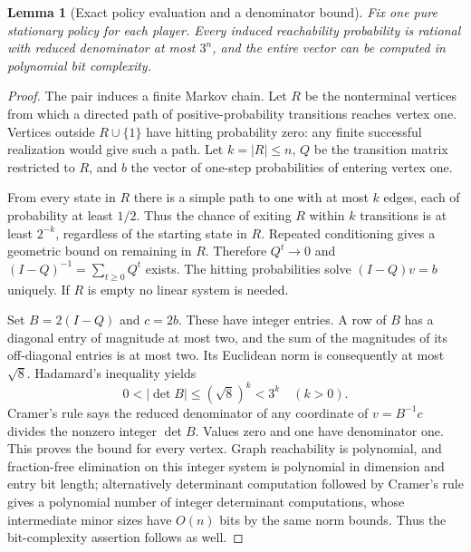 \documentclass[11pt,a4paper]{article}
\newtheorem{lemma}[theorem]{Lemma}
\theoremstyle{definition}
\theoremstyle{remark}
\begin{document}
\begin{lemma}[Exact policy evaluation and a denominator bound]
Fix one pure stationary policy for each player. Every induced reachability probability is rational with reduced denominator at most $3^n$, and the entire vector can be computed in polynomial bit complexity.
\end{lemma}
\begin{proof}
The pair induces a finite Markov chain. Let $R$ be the nonterminal vertices from which a directed path of positive-probability transitions reaches vertex one. Vertices outside $R\cup\{1\}$ have hitting probability zero: any finite successful realization would give such a path. Let $k=|R|\leq n$, $Q$ be the transition matrix restricted to $R$, and $b$ the vector of one-step probabilities of entering vertex one.

From every state in $R$ there is a simple path to one with at most $k$ edges, each of probability at least $1/2$. Thus the chance of exiting $R$ within $k$ transitions is at least $2^{-k}$, regardless of the starting state in $R$. Repeated conditioning gives a geometric bound on remaining in $R$. Therefore $Q^t\to0$ and $(I-Q)^{-1}=\sum_{t\geq0}Q^t$ exists. The hitting probabilities solve $(I-Q)v=b$ uniquely. If $R$ is empty no linear system is needed.

Set $B=2(I-Q)$ and $c=2b$. These have integer entries. A row of $B$ has a diagonal entry of magnitude at most two, and the sum of the magnitudes of its off-diagonal entries is at most two. Its Euclidean norm is consequently at most $\sqrt8$. Hadamard's inequality yields
\[
 0<|\det B|\leq(\sqrt8)^k<3^k\quad(k>0).
\]
Cramer's rule says the reduced denominator of any coordinate of $v=B^{-1}c$ divides the nonzero integer $\det B$. Values zero and one have denominator one. This proves the bound for every vertex. Graph reachability is polynomial, and fraction-free elimination on this integer system is polynomial in dimension and entry bit length; alternatively determinant computation followed by Cramer's rule gives a polynomial number of integer determinant computations, whose intermediate minor sizes have $O(n)$ bits by the same norm bounds. Thus the bit-complexity assertion follows as well.
\end{proof}
\end{document}
